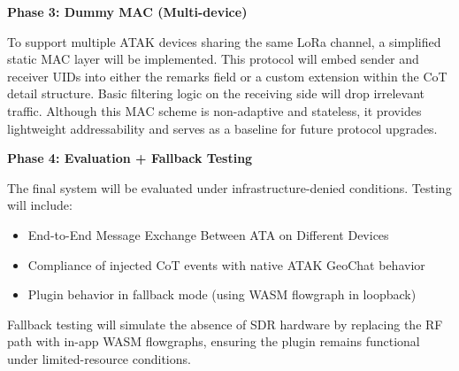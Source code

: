 \vspace{0.5em}
\noindent\textbf{Phase 3: Dummy MAC (Multi-device)}\par
To support multiple ATAK devices sharing the same LoRa channel, a simplified static MAC layer will be implemented. This protocol will embed sender and receiver UIDs into either the remarks field or a custom extension within the CoT detail structure. Basic filtering logic on the receiving side will drop irrelevant traffic. Although this MAC scheme is non-adaptive and stateless, it provides lightweight addressability and serves as a baseline for future protocol upgrades.

\vspace{0.5em}
\noindent\textbf{Phase 4: Evaluation + Fallback Testing}\par
The final system will be evaluated under infrastructure-denied conditions. Testing will include:
\begin{itemize}
    \item End-to-End Message Exchange Between ATA on Different Devices
    \item Compliance of injected CoT events with native ATAK GeoChat behavior
    \item Plugin behavior in fallback mode (using WASM flowgraph in loopback)
\end{itemize}
Fallback testing will simulate the absence of SDR hardware by replacing the RF path with in-app WASM flowgraphs, ensuring the plugin remains functional under limited-resource conditions.

